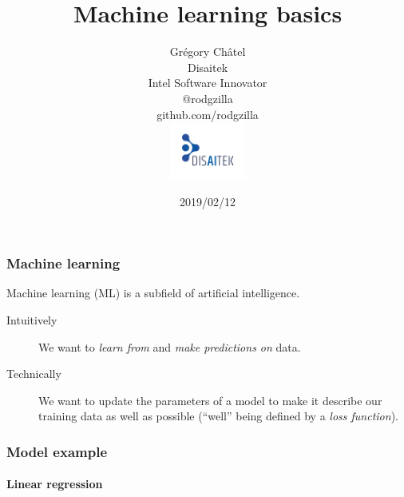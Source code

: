 \documentclass[9pt]{beamer}
\title{Machine learning basics}
\author[G. Châtel]{Grégory Châtel\\\vspace{0.3cm}Disaitek\\Intel Software Innovator\\\vspace{0.3cm}@rodgzilla\\github.com/rodgzilla\\\vspace{.5cm}\includegraphics[width = 2.5cm]{images/logo_disaitek.png} \vspace{-1cm}
}
\date{2019/02/12}
\begin{document}
\begin{frame}

  \maketitle

\end{frame}

\begin{frame}

  \frametitle{Machine learning}

  Machine learning (ML) is a subfield of artificial intelligence.

  \bigskip

  \begin{description}
    \item[Intuitively] We want to \emph{learn from} and \emph{make predictions
    on} data.

      \medskip

    \item[Technically] We want to update the parameters of a model to
      make it describe our training data as well as possible (``well''
      being defined by a \emph{loss function}).
  \end{description}

\end{frame}

\begin{frame}
  \frametitle{Model example}

  \framesubtitle{Linear regression}

  \begin{center}
    \scalebox{1.3}{
      
    }
  \end{center}

\end{frame}
\end{document}
